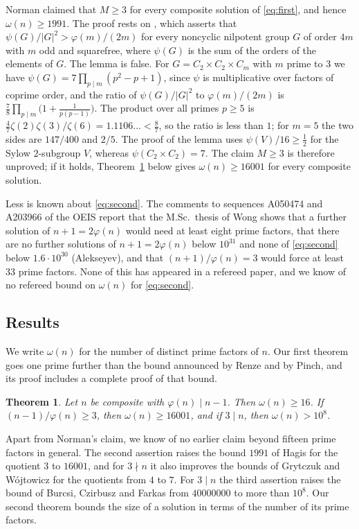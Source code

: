 \documentclass[screen,reqno]{aomart}
\numberwithin{equation}{section}
\theoremstyle{plain}
\newtheorem{theorem}{Theorem}[section]
\theoremstyle{definition}
\theoremstyle{remark}
\begin{document}
Norman \cite{Nor21} claimed that $M\ge3$ for every composite solution
of \eqref{eq:first}, and hence $\omega(n)\ge1991$. The proof rests on
\cite[Lemma~2.1]{Nor21}, which asserts that
$\psi(G)/|G|^2>\varphi(m)/(2m)$ for every noncyclic nilpotent group
$G$ of order $4m$ with $m$ odd and squarefree, where $\psi(G)$ is the
sum of the orders of the elements of $G$. The lemma is false. For
$G=C_2\times C_2\times C_m$ with $m$ prime to $3$ we have
$\psi(G)=7\prod_{p\mid m}(p^2-p+1)$, since $\psi$ is multiplicative
over factors of coprime order, and the ratio of $\psi(G)/|G|^2$ to
$\varphi(m)/(2m)$ is $\frac78\prod_{p\mid m}\bigl(1+\frac1{p(p-1)}\bigr)$.
The product over all primes $p\ge5$ is
$\frac47\zeta(2)\zeta(3)/\zeta(6)=1.1106\ldots<\frac87$, so the ratio
is less than $1$; for $m=5$ the two sides are $147/400$ and $2/5$. The
proof of the lemma uses $\psi(V)/16\ge\frac12$ for the Sylow
$2$-subgroup $V$, whereas $\psi(C_2\times C_2)=7$. The claim $M\ge3$
is therefore unproved; if it holds, Theorem~\ref{thm:first} below gives
$\omega(n)\ge16001$ for every composite solution.

Less is known about \eqref{eq:second}. The comments to
sequences A050474 and A203966 of the OEIS \cite{OEIS} report that the
M.Sc.\ thesis of Wong \cite{Won97} shows that a further solution of
$n+1=2\varphi(n)$ would need at least eight prime factors, that there
are no further solutions of $n+1=2\varphi(n)$ below $10^{31}$ and none
of \eqref{eq:second} below $1.6\cdot10^{30}$ (Alekseyev), and that
$(n+1)/\varphi(n)=3$ would force at least $33$ prime factors. None of
this has appeared in a refereed paper, and we know of no refereed bound
on $\omega(n)$ for \eqref{eq:second}.

\subsection{Results}
We write $\omega(n)$ for the number of distinct prime factors of $n$.
Our first theorem goes one prime further than the bound announced by
Renze and by Pinch, and its proof includes a complete proof of that
bound.

\begin{theorem}\label{thm:first}
Let $n$ be composite with $\varphi(n)\mid n-1$. Then $\omega(n)\ge16$.
If $(n-1)/\varphi(n)\ge3$, then $\omega(n)\ge16001$, and if $3\mid n$,
then $\omega(n)>10^8$.
\end{theorem}

Apart from Norman's claim, we know of no earlier claim beyond fifteen
prime factors in general. The second assertion raises the bound $1991$
of Hagis for the quotient $3$ to $16001$, and for $3\nmid n$ it also
improves the bounds of Grytczuk and W\'ojtowicz for the quotients from
$4$ to $7$. For $3\mid n$ the third
assertion raises the bound of Burcsi, Czirbusz and Farkas from
$40000000$ to more than $10^8$. Our second theorem bounds the size of a solution in terms of the
number of its prime factors.
\end{document}
